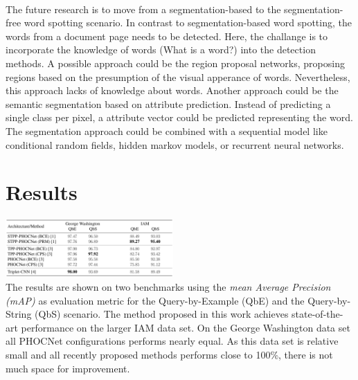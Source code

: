 \documentclass[a0,portrait]{a0poster}
\providecommand{\postersection}[1]{
\color{tucol2}
\section*{\sf \huge #1}\Large\sf
\color{Black}
}
\begin{document}
\begin{multicols}{2}
\\
\normalsize
%
The future research is to move from a segmentation-based to the 
segmentation-free word spotting scenario. In contrast to segmentation-based 
word spotting, the words from a document page needs to be detected. 
Here, the challange is to incorporate the knowledge of words (What is a word?) into the 
detection methods. A possible approach could be the region proposal networks, proposing 
regions based on the presumption of the visual apperance of words. Nevertheless, this 
approach lacks of knowledge about words. Another approach could be the semantic segmentation 
based on attribute prediction. Instead of predicting a single class per pixel, a attribute 
vector could be predicted representing the word. The segmentation approach could be 
combined with a sequential model like conditional random fields, hidden markov models, 
or recurrent neural networks.


\columnbreak

\postersection{Results}
%
\includegraphics[width=0.48\textwidth]{gfx/results.png}
%
\vspace{1.5cm}
\\
\normalsize
The results are shown on two benchmarks using the \emph{mean Average Precision (mAP)} as evaluation metric 
for the Query-by-Example (QbE) and the Query-by-String (QbS) scenario. 
The method proposed in this work achieves state-of-the-art performance on the larger IAM data set. 
On the George Washington data set all PHOCNet configurations performs nearly equal. As this 
data set is relative small and all recently proposed methods performs close to 100\%, there is 
not much space for improvement.

\end{multicols}
\vspace{-1cm}
\end{document}
